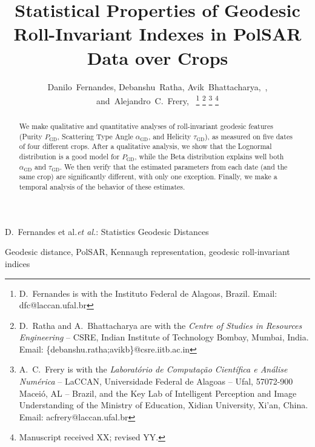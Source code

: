 \documentclass[journal]{IEEEtran}
\begin{document}
\title{Statistical Properties of Geodesic Roll-Invariant Indexes in PolSAR Data over Crops}

\author{Danilo~Fernandes,
	Debanshu~Ratha,
	Avik~Bhattacharya,~,
	and~Alejandro~C.~Frery,~%
	\thanks{D.\ Fernandes is with the Instituto Federal de Alagoas, Brazil. Email: dfc@laccan.ufal.br}%
	\thanks{D.\ Ratha and A.\ Bhattacharya are with the \textit{Centre of Studies in Resources Engineering}
		-- CSRE, Indian Institute of Technology Bombay, Mumbai, India. Email: \{debanshu.ratha;avikb\}@csre.iitb.ac.in}%
	\thanks{A.\ C.\ Frery is with the \textit{Laborat\'orio de Computa\c c\~ao Cient\'ifica e An\'alise Num\'erica} -- LaCCAN, 
		Universidade Federal de Alagoas -- Ufal, 
		57072-900 Macei\'o, AL -- Brazil, and the Key Lab of Intelligent Perception and Image Understanding of the Ministry of Education, Xidian University, Xi'an, China. Email: acfrery@laccan.ufal.br}
	\thanks{Manuscript received XX; revised YY.}}

%
{D.\ Fernandes et al.\MakeLowercase{\textit{et al.}}: Statistics Geodesic Distances}

\maketitle

\begin{abstract}
	We make qualitative and quantitative analyses of roll-invariant geodesic features (Purity $P_{\text{GD}}$, Scattering Type Angle $\alpha_{\text{GD}}$, and Helicity $\tau_{\text{GD}}$), as measured on five dates of four different crops.
	After a qualitative analysis, we show that the Lognormal distribution is a good model for $P_{\text{GD}}$, while the Beta distribution explains well both $\alpha_{\text{GD}}$ and $\tau_{\text{GD}}$.
	We then verify that the estimated parameters from each date (and the same crop) are significantly different, with only one exception.
	Finally, we make a temporal analysis of the behavior of these estimates.
\end{abstract}

\begin{IEEEkeywords}
	Geodesic distance, PolSAR, Kennaugh representation, geodesic roll-invariant indices
\end{IEEEkeywords}

\IEEEpeerreviewmaketitle
\end{document}
